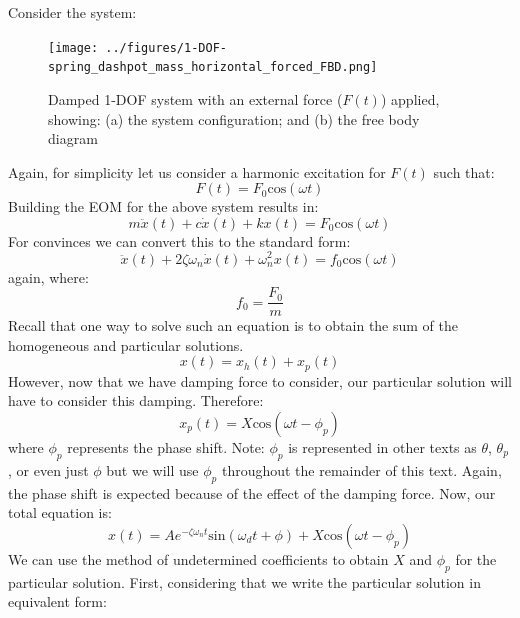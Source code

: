 \documentclass[12pt,letter]{article}
\numberwithin{ex}{section} %
\numberwithin{re}{section} %
\begin{document}
			Consider the system:
			\begin{figure}[H]
				\centering
				\texttt{[image: ../figures/1-DOF-spring\_dashpot\_mass\_horizontal\_forced\_FBD.png]}
				\caption{Damped 1-DOF system with an external force ($F(t)$) applied, showing: (a) the system configuration; and (b) the free body diagram}
			\end{figure}	
			\noindent Again, for simplicity let us consider a harmonic excitation for $F(t)$ such that:
			\begin{equation}
				F(t) = F_0\text{cos}(\omega t)
			\end{equation}							
			Building the EOM for the above system results in:
			\begin{equation}
				m \ddot{x}(t)+c\dot{x}(t)+kx(t) = F_0\text{cos}(\omega t)
			\end{equation}			
			For convinces we can convert this to the standard form:					
			\begin{equation}
				\ddot{x}(t)+2 \zeta \omega_n \dot{x}(t) +\omega_n^2x(t) = f_0\text{cos}(\omega t)
			\end{equation}					
			again, where:
			\begin{equation}
				f_0 = \frac{F_0}{m}
			\end{equation}	
			Recall that one way to solve such an equation is to obtain the sum of the homogeneous and particular solutions. 
			\begin{equation}
				x(t) = x_h(t) + x_p(t)
			\end{equation}	
			However, now that we have damping force to consider, our particular solution will have to consider this damping. Therefore:
			\begin{equation}
				\label{eq:x_p(t)}
				x_p(t) = X \text{cos}(\omega t - \phi_p)
			\end{equation}
			where $\phi_p$ represents the phase shift. Note: $\phi_p$ is represented in other texts as $\theta$, $\theta_p$, or even just $\phi$ but we will use $\phi_p$ throughout the remainder of this text. Again, the phase shift is expected because of the effect of the damping force. Now, our total equation is:
			\begin{equation}
				x(t) = Ae^{-\zeta \omega_n t}\text{sin}(\omega_d t + \phi) +  X \text{cos}(\omega t - \phi_p)
			\end{equation}			
			We can use the method of undetermined coefficients to obtain $X$ and $\phi_p$ for the particular solution. First, considering that we write the particular solution in equivalent form:
\end{document}
